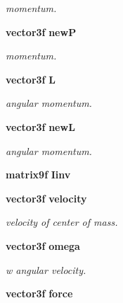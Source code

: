 \begin{CompactItemize}
\begin{CompactList}\small\item\em momentum.\item\end{CompactList}\item 
{}
{\bf vector3f} {\bf new\-P}\label{classmovable_m6}

\begin{CompactList}\small\item\em momentum.\item\end{CompactList}\item 
{}
{\bf vector3f} {\bf L}\label{classmovable_m7}

\begin{CompactList}\small\item\em angular momentum.\item\end{CompactList}\item 
{}
{\bf vector3f} {\bf new\-L}\label{classmovable_m8}

\begin{CompactList}\small\item\em angular momentum.\item\end{CompactList}\item 
{}
{\bf matrix9f} {\bf Iinv}\label{classmovable_m9}

\item 
{}
{\bf vector3f} {\bf velocity}\label{classmovable_m10}

\begin{CompactList}\small\item\em velocity of center of mass.\item\end{CompactList}\item 
{}
{\bf vector3f} {\bf omega}\label{classmovable_m11}

\begin{CompactList}\small\item\em w angular velocity.\item\end{CompactList}\item 
{}
{\bf vector3f} {\bf force}\label{classmovable_m12}


\end{CompactItemize}
